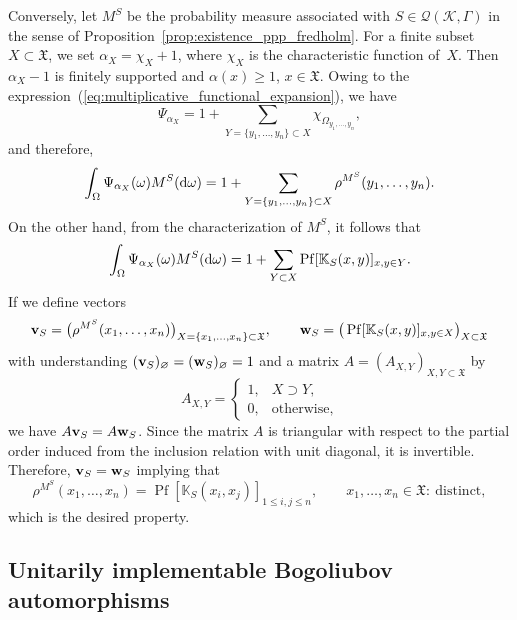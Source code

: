 \documentclass[pdftex]{sigma}
\numberwithin{equation}{section}
\newcommand{\pf}{\operatorname{Pf}}
\newcommand{\mfrak}[1]{\mathfrak{#1}}
\newcommand{\mcal}[1]{\mathcal{#1}}
\newcommand{\mbb}[1]{\mathbb{#1}}
\begin{document}
Conversely, let $M^{S}$ be the probability measure associated with $S\in \mcal{Q}(\mcal{K},\Gamma)$ in the sense of Proposition~\ref{prop:existence_ppp_fredholm}.
For a finite subset $X\subset\mfrak{X}$, we set $\alpha_{X}=\chi_{X}+1$, where $\chi_{X}$ is the characteristic function of~$X$. Then $\alpha_{X}-1$ is finitely supported and $\alpha(x)\ge 1$, $x\in\mfrak{X}$. Owing to the expression~(\ref{eq:multiplicative_functional_expansion}), we have
\begin{equation*}
	\Psi_{\alpha_{X}}=1+\sum_{Y=\{y_{1},\dots, y_{n}\}\subset X}\chi_{\Omega_{y_{1},\dots, y_{n}}},
\end{equation*}
and therefore,
\begin{equation*}
	\int_{\Omega}\Psi_{\alpha_{X}}(\omega)M^{S}({\rm d}\omega)=1+\sum_{Y=\{y_{1},\dots, y_{n}\}\subset X}\rho^{M^{S}}(y_{1},\dots, y_{n}).
\end{equation*}
On the other hand, from the characterization of $M^{S}$, it follows that
\begin{equation*}
	\int_{\Omega}\Psi_{\alpha_{X}}(\omega) M^{S}({\rm d}\omega)=1+\sum_{Y\subset X}\pf [\mbb{K}_{S}(x,y) ]_{x,y\in Y}.
\end{equation*}
If we define vectors
\begin{gather*}
	{\bf v}_{S} =\big(\rho^{M^{S}}(x_{1},\dots, x_{n})\big)_{X=\{x_{1},\dots, x_{n}\}\subset\mfrak{X}},\qquad {\bf w}_{S} =\big(\pf [\mbb{K}_{S}(x,y) ]_{x,y\in X}\big)_{X\subset\mfrak{X}}
\end{gather*}
with understanding $ ({\bf v}_{S} )_{\varnothing}= ({\bf w}_{S} )_{\varnothing}=1$ and a matrix $A=(A_{X,Y})_{X, Y\subset \mfrak{X}}$ by
\begin{equation*}
	A_{X,Y}=\begin{cases}
	1, & X\supset Y, \\
	0, & \mbox{otherwise},
	\end{cases}
\end{equation*}
we have $A{\bf v}_{S}=A{\bf w}_{S}$. Since the matrix $A$ is triangular with respect to the partial order induced from the inclusion relation with unit diagonal, it is invertible. Therefore, ${\bf v}_{S}={\bf w}_{S}$ implying that
\begin{equation*}
	\rho^{M^{S}}(x_{1},\dots, x_{n})=\pf [\mbb{K}_{S}(x_{i},x_{j}) ]_{1\le i,j\le n},\qquad x_{1},\dots, x_{n}\in\mfrak{X}\colon \ \mbox{distinct},
\end{equation*}
which is the desired property.

\subsection{Unitarily implementable Bogoliubov automorphisms}
\end{document}
